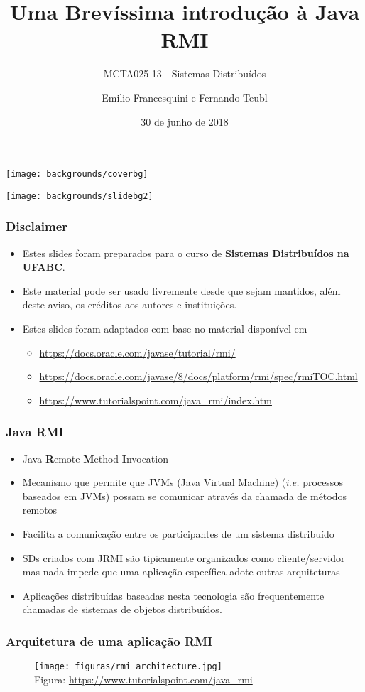 \documentclass[Ligatures=TeX,table,brazil,svgnames,usetotalslideindicator,comp
ress,10pt]{beamer}
\title{Uma Brevíssima introdução à Java RMI}
\subtitle{MCTA025-13 - Sistemas Distribuídos}
\author{Emilio Francesquini e Fernando Teubl}
\institute{Centro de Matemática, Computação e Cognição\\ Universidade Federal do ABC}
\date{30 de junho de 2018}
\newcommand{\setcoverbg}{
    \setbeamertemplate{background}
     {\texttt{[image: backgrounds/coverbg]}}
}
\newcommand{\setsectionbg}{
    \setbeamertemplate{background}
     {\texttt{[image: backgrounds/slidebg2]}}
}
\begin{document}
\setcoverbg
\maketitle

\setsectionbg

\begin{frame}
  \frametitle{Disclaimer}
  \begin{itemize}
  \item Estes slides foram preparados para o curso de \textbf{Sistemas
      Distribuídos na UFABC}.
  \item Este material pode ser usado livremente desde que sejam
    mantidos, além deste aviso, os créditos aos autores e
    instituições.
  \item Estes slides foram adaptados com base no material disponível
    em
    \begin{itemize}
      \item \url{https://docs.oracle.com/javase/tutorial/rmi/}
      \item \url{https://docs.oracle.com/javase/8/docs/platform/rmi/spec/rmiTOC.html}
      \item \url{https://www.tutorialspoint.com/java_rmi/index.htm}
    \end{itemize}
  \end{itemize}
\end{frame}

\begin{frame}
  \frametitle{Java RMI}
  \begin{itemize}
  \item Java \textbf{R}emote \textbf{M}ethod \textbf{I}nvocation
  \item Mecanismo que permite que JVMs (Java Virtual Machine)
    (\emph{i.e.} processos baseados em JVMs) possam se comunicar
    através da chamada de métodos remotos
  \item Facilita a comunicação entre os participantes de um
    sistema distribuído
  \item SDs criados com JRMI são tipicamente organizados como cliente/servidor mas nada
    impede que uma aplicação específica adote outras arquiteturas
  \item Aplicações distribuídas baseadas nesta tecnologia são
    frequentemente chamadas de \alert{sistemas de objetos
      distribuídos}.
  \end{itemize}
\end{frame}


\begin{frame}
  \frametitle{Arquitetura de uma aplicação RMI}
  \begin{figure}[ht]
    \centering
    \texttt{[image: figuras/rmi\_architecture.jpg]}
    \\\tiny{Figura: \url{https://www.tutorialspoint.com/java_rmi}}
  \end{figure}
\end{frame}
\end{document}
